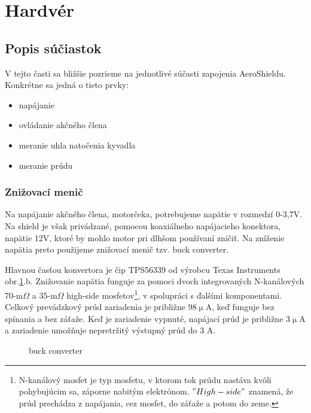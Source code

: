\newpage
\section{Hardvér}
\subsection{Popis súčiastok}

V tejto časti sa bližšie pozrieme na jednotlivé súčasti zapojenia AeroShieldu. Konkrétne sa jedná o tieto prvky:
\begin{multicols}{2}
	\begin{itemize}
		\item napájanie
		\item ovládanie akčného člena
		\item meranie uhla natočenia kyvadla
		\item meranie prúdu
	\end{itemize}
\end{multicols}


\subsubsection{Znižovací menič}
\label{nap}

Na napájanie akčného člena, motorčeka, potrebujeme napätie v rozmedzí 0-3,7V. Na shield je však privádzané, pomocou koaxiálneho napájacieho konektora, napätie 12V, ktoré by mohlo motor pri dlhšom používaní zničiť. Na zníženie napätia preto použijeme znižovací menič tzv. buck converter. 

Hlavnou časťou konvertora je čip TPS56339 od výrobcu Texas Instruments obr.\ref{OBRAZOK 2.1}.b. Znižovanie napätia funguje za pomoci dvoch integrovaných N-kanálových 70-m$\Omega$ a 35-m$\Omega$ high-side mosfetov\footnote[4]{N-kanálový mosfet je typ mosfetu, v ktorom tok prúdu nastáva kvôli pohybujúcim sa, záporne nabitým elektrónom. $"High-side"$ znamená, že prúd prechádza z napájania, cez mosfet, do záťaže a potom do zeme.}, v spolupráci s ďalšími komponentami. Celkový prevádzkový prúd zariadenia je približne 98$\upmu$A, keď funguje bez spínania a bez záťaže. Keď je zariadenie vypnuté, napájací prúd je približne 3$\upmu$A a zariadenie umožňuje nepretržitý výstupný prúd do 3 A\cite{buckobr}.

\begin{figure}[!tbh]
	\hfill
	\hfill
	\hfill
	\caption{buck converter}\label{OBRAZOK 2.1}
\end{figure}

